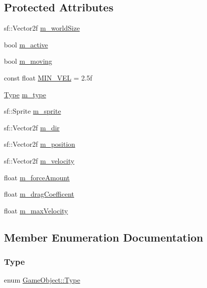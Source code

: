 \subsection*{Protected Attributes}
\begin{DoxyCompactItemize}
\item 
sf\+::\+Vector2f \hyperlink{class_game_object_aaa744dee1a44e81989750a0bf532d345}{m\+\_\+world\+Size}
\item 
bool \hyperlink{class_game_object_a65307073834455243a8b339592245603}{m\+\_\+active}
\item 
bool \hyperlink{class_game_object_a4a967007dc8abe7696dbea4fbc6e330f}{m\+\_\+moving}
\item 
const float \hyperlink{class_game_object_ab24605ea883a0fa01265cac2bc23d849}{M\+I\+N\+\_\+\+V\+EL} = 2.\+5f
\item 
\hyperlink{class_game_object_a4bf9e8f660e6a49f1b802c2aa9dd95af}{Type} \hyperlink{class_game_object_ac73f50b3bd626abc03647e1c3f7fa17e}{m\+\_\+type}
\item 
sf\+::\+Sprite \hyperlink{class_game_object_aa5d62b9e42b89d3a7ee972e987f62833}{m\+\_\+sprite}
\item 
sf\+::\+Vector2f \hyperlink{class_game_object_af25062526c869696573ef9d1a8bce992}{m\+\_\+dir}
\item 
sf\+::\+Vector2f \hyperlink{class_game_object_afe4ee8de1edaad34d0a7022cfe990769}{m\+\_\+position}
\item 
sf\+::\+Vector2f \hyperlink{class_game_object_a2eb49c3d52900ab554127ccb3fa63061}{m\+\_\+velocity}
\item 
float \hyperlink{class_game_object_af267bc333690ad297f1a7940e5c2c9b7}{m\+\_\+force\+Amount}
\item 
float \hyperlink{class_game_object_a395c9cbb77e0a4b9224b1d85829192e8}{m\+\_\+drag\+Coefficent}
\item 
float \hyperlink{class_game_object_a7649de31569ac7360f4cb8e47329aec6}{m\+\_\+max\+Velocity}
\end{DoxyCompactItemize}


\subsection{Member Enumeration Documentation}
\mbox{\label{class_game_object_a4bf9e8f660e6a49f1b802c2aa9dd95af}} 
\subsubsection{\texorpdfstring{Type}{Type}}
{\footnotesize\ttfamily enum \hyperlink{class_game_object_a4bf9e8f660e6a49f1b802c2aa9dd95af}{Game\+Object\+::\+Type}\hspace{0.3cm}{\ttfamily [strong]}}


